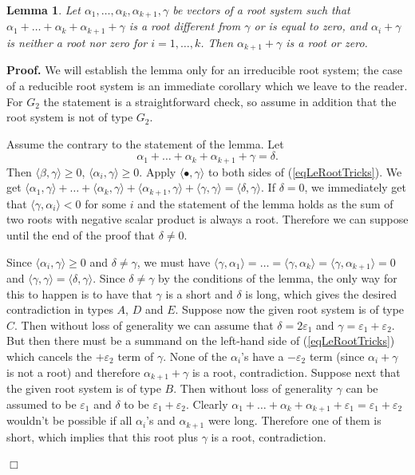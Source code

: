 \documentclass[12pt]{report}
\newtheorem{lemma}[theo]{Lemma}
\newenvironment{proof}[1][]{ \textbf{Proof#1. }}{$\Box$\medskip}
\newcommand{\eps}{\varepsilon}
\begin{document}
\begin{lemma}\label{lestreakOfRoots} Let $\alpha_1,\dots,\alpha_k,\alpha_{k+1},\gamma$ be vectors of a root system such that $\alpha_1+ \dots+ \alpha_k + \alpha_{k+1}+\gamma$ is a root different from $\gamma$ or is equal to zero, and $\alpha_i+\gamma$ is neither a root nor zero for $i=1,\dots,k$. Then $\alpha_{k+1}+\gamma$ is a root or zero.
\end{lemma}
\begin{proof}
We will establish the lemma only for an irreducible root system; the case of a reducible root system is an immediate corollary which we leave to the reader. For $G_2$ the statement is a straightforward check, so assume in addition that the root system is not of type $G_2$. 

Assume the contrary to the statement of the lemma. Let 
\begin{equation}\label{eqLeRootTricks}
\alpha_1+\dots+\alpha_k+\alpha_{k+1}+\gamma=\delta.
\end{equation} 
Then $\langle\beta,\gamma\rangle\geq 0$, $\langle\alpha_i,\gamma\rangle\geq 0$. Apply $\langle \bullet,\gamma\rangle$ to both sides of (\ref{eqLeRootTricks}). We get $\langle\alpha_1, \gamma\rangle+ \dots+\langle \alpha_k , \gamma \rangle+\langle\alpha_{k+1}, \gamma \rangle + \langle \gamma, \gamma \rangle = \langle \delta,\gamma\rangle$. If $\delta=0$, we immediately get that $\langle\gamma,\alpha_i\rangle<0$ for some $i$ and the statement of the lemma holds as the sum of two roots with negative scalar product is always a root. Therefore we can suppose until the end of the proof that $\delta\neq 0$. 

Since $\langle\alpha_i,\gamma\rangle\geq 0$ and $\delta\neq \gamma$, we must have $\langle \gamma, \alpha_1 \rangle = \dots= \langle \gamma, \alpha_k \rangle= \langle \gamma, \alpha_{k+1} \rangle= 0$ and $\langle \gamma, \gamma \rangle= \langle \delta, \gamma \rangle $. Since $\delta \neq \gamma$ by the conditions of the lemma, the only way for this to happen is to have that $\gamma$ is a short and $\delta$ is long, which gives the desired contradiction in types $A$, $D$ and $E$. Suppose now the given root system is of type $C$. Then without loss of generality we can assume that $\delta = 2\eps_1$ and $\gamma= \eps_1 + \eps_2$. But then there must be a summand on the left-hand side of (\ref{eqLeRootTricks}) which cancels the $+\eps_2$ term of $\gamma$. None of the $\alpha_i$'s have a $-\eps_2$ term (since $\alpha_i+\gamma$ is not a root) and therefore $\alpha_{k+1}+\gamma$ is a root, contradiction. Suppose next that the given root system is of type $B$. Then without loss of generality $\gamma$ can be assumed to be $\eps_1$ and $\delta$ to be $\eps_1+\eps_2$. Clearly  $\alpha_1+ \dots+\alpha_k +\alpha_{k+1} +\eps_1 = \eps_1+\eps_2$ wouldn't be possible if all $\alpha_i$'s and $\alpha_{k+1}$ were long. Therefore one of them is short, which implies that this root plus $\gamma$ is a root, contradiction.


\end{proof}
\end{document}
